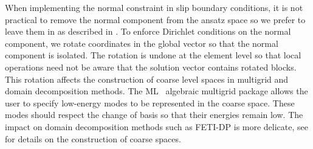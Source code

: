When implementing the normal constraint in slip boundary conditions, it is not practical to remove the normal component from the ansatz space so we prefer to leave them in as described in .
To enforce Dirichlet conditions on the normal component, we rotate coordinates in the global vector so that the normal component is isolated.
The rotation is undone at the element level so that local operations need not be aware that the solution vector contains rotated blocks.
This rotation affects the construction of coarse level spaces in multigrid and domain decomposition methods.
The ML~\citep{ml-guide} algebraic multigrid package allows the user to specify low-energy modes to be represented in the coarse space.
These modes should respect the change of basis so that their energies remain low.
The impact on domain decomposition methods such as FETI-DP is more delicate, see \citet{klawonn2007robust,klawonn2006dual,dohrmann2010hybrid} for details on the construction of coarse spaces.

